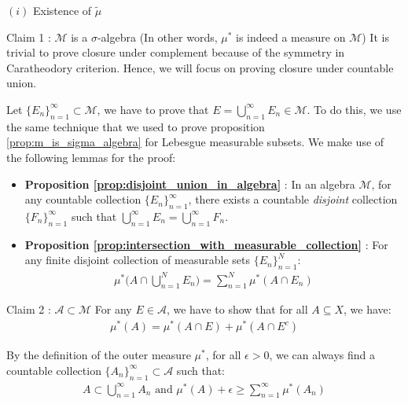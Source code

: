 \begin{proof*}
\begin{subproof}{$(i)$ Existence of $\tilde\mu$}
        \begin{subproof}{\newline Claim 1 : $\mathcal{M}$ is a $\sigma$-algebra (In other words, $\mu^*$ is indeed a measure on $\mathcal{M}$)}
            \noindent It is trivial to prove closure under complement because of the symmetry in Caratheodory criterion. Hence, we will focus on proving closure under countable union.\newline 
            
            \noindent Let $\{E_n\}_{n=1}^\infty\subset \mathcal{M}$, we have to prove that $E = \bigcup_{n=1}^\infty E_n \in \mathcal{M}$. To do this, we use the same technique that we used to prove proposition \ref{prop:m_is_sigma_algebra} for Lebesgue measurable subsets. We make use of the following lemmas for the proof:
            \begin{itemize}
                \item \textbf{Proposition \ref{prop:disjoint_union_in_algebra}} : In an algebra $\mathcal{M}$, for any countable collection $\{E_n\}_{n=1}^\infty$, there exists a countable \textit{disjoint} collection $\{F_n\}_{n=1}^\infty$ such that $\bigcup_{n=1}^\infty E_n = \bigcup_{n=1}^\infty F_n$.
                \item \textbf{Proposition \ref{prop:intersection_with_measurable_collection}} : For any finite disjoint collection of measurable sets $\{E_n\}_{n=1}^N$:
                \begin{align*}
                    \mu^*\Bigg( A \cap \bigcup_{n=1}^N E_n \Bigg) = \sum_{n=1}^N \mu^*(A\cap E_n)
                \end{align*}
            \end{itemize}
        \end{subproof}

        \begin{subproof}{\newline Claim 2 : $\mathcal{A} \subset \mathcal{M}$}
           For any $E \in \mathcal{A}$, we have to show that for all $A\subseteq X$, we have:
           \begin{align*}
               \mu^*(A) = \mu^*(A \cap E) + \mu^*(A\cap E^c) 
           \end{align*}

           \noindent\newline By the definition of the outer measure $\mu^*$, for all $\epsilon > 0$, we can always find a countable collection $\{A_n\}_{n=1}^\infty\subset\mathcal{A}$ such that:
           \begin{align*}
               A \subset \bigcup_{n=1}^\infty A_n \text{ and } \mu^*(A) + \epsilon \ge \sum_{n=1}^\infty \mu^*(A_n)
           \end{align*}


\end{subproof}
\end{subproof}
\end{proof*}
